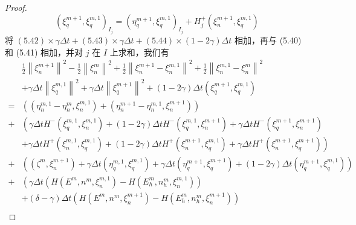 \begin{proof}
\begin{equation}
        \left(\xi_{q}^{m+1}, \xi_{q}^{m, 1}\right)_{I_{j}}=\left(\eta_{q}^{m+1}, \xi_{q}^{m, 1}\right)_{I_{j}}+H_{j}^{+}\left(\xi_{n}^{m+1}, \xi_{q}^{m, 1}\right)
    \end{equation}
    将 $(5.42) \times \gamma \Delta t+(5.43) \times \gamma \Delta t+(5.44) \times(1-2 \gamma) \Delta t$ 相加，再与 (5.40) 和 (5.41) 相加，并对 $j$ 在 $I$ 上求和，我们有
    \begin{align*}
          & \frac{1}{2}\left\|\xi_{n}^{m+1}\right\|^{2}-\frac{1}{2}\left\|\xi_{n}^{m}\right\|^{2}+\frac{1}{2}\left\|\xi_{n}^{m+1}-\xi_{n}^{m, 1}\right\|^{2}+\frac{1}{2}\left\|\xi_{n}^{m, 1}-\xi_{n}^{m}\right\|^{2}                                 \\
          & +\gamma \Delta t\left\|\xi_{q}^{m, 1}\right\|^{2}+\gamma \Delta t\left\|\xi_{q}^{m+1}\right\|^{2}+(1-2 \gamma) \Delta t\left(\xi_{q}^{m+1}, \xi_{q}^{m, 1}\right)                                                                         \\
        = & \left(\left(\eta_{n}^{m, 1}-\eta_{n}^{m}, \xi_{n}^{m, 1}\right)+\left(\eta_{n}^{m+1}-\eta_{n}^{m, 1}, \xi_{n}^{m+1}\right)\right)                                                                                                         \\
        + & \left(\gamma \Delta t H^{-}\left(\xi_{q}^{m, 1}, \xi_{n}^{m, 1}\right)+(1-2 \gamma) \Delta t H^{-}\left(\xi_{q}^{m, 1}, \xi_{n}^{m+1}\right)+\gamma \Delta t H^{-}\left(\xi_{q}^{m+1}, \xi_{n}^{m+1}\right)\right.                        \\
          & \left.+\gamma \Delta t H^{+}\left(\xi_{n}^{m, 1}, \xi_{q}^{m, 1}\right)+(1-2 \gamma) \Delta t H^{+}\left(\xi_{n}^{m+1}, \xi_{q}^{m, 1}\right)+\gamma \Delta t H^{+}\left(\xi_{n}^{m+1}, \xi_{q}^{m+1}\right)\right)                       \\
        + & \left(\left(\zeta^{m}, \xi_{n}^{m+1}\right)+\gamma \Delta t\left(\eta_{q}^{m, 1}, \xi_{q}^{m, 1}\right)+\gamma \Delta t\left(\eta_{q}^{m+1}, \xi_{q}^{m+1}\right)+(1-2 \gamma) \Delta t\left(\eta_{q}^{m+1}, \xi_{q}^{m, 1}\right)\right) \\
        + & \left(\gamma \Delta t\left(H\left(E^{m}, n^{m}, \xi_{n}^{m, 1}\right)-H\left(E_{h}^{m}, n_{h}^{m}, \xi_{n}^{m, 1}\right)\right)\right.                                                                                                    \\
          & +(\delta-\gamma) \Delta t\left(H\left(E^{m}, n^{m}, \xi_{n}^{m+1}\right)-H\left(E_{h}^{m}, n_{h}^{m}, \xi_{n}^{m+1}\right)\right)                                                                                                         \\

\end{align*}
\end{proof}
